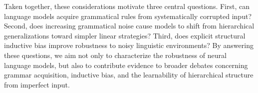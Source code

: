 Taken together, these considerations motivate three central questions. First, can language models acquire grammatical rules from systematically corrupted input? Second, does increasing grammatical noise cause models to shift from hierarchical generalizations toward simpler linear strategies? Third, does explicit structural inductive bias improve robustness to noisy linguistic environments? By answering these questions, we aim not only to characterize the robustness of neural language models, but also to contribute evidence to broader debates concerning grammar acquisition, inductive bias, and the learnability of hierarchical structure from imperfect input.

